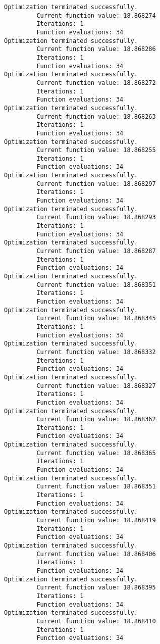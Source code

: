 \documentclass[11pt]{article}
\begin{document}
\begin{Verbatim}[commandchars=\\\{\}]
Optimization terminated successfully.
         Current function value: 18.868274
         Iterations: 1
         Function evaluations: 34
Optimization terminated successfully.
         Current function value: 18.868286
         Iterations: 1
         Function evaluations: 34
Optimization terminated successfully.
         Current function value: 18.868272
         Iterations: 1
         Function evaluations: 34
Optimization terminated successfully.
         Current function value: 18.868263
         Iterations: 1
         Function evaluations: 34
Optimization terminated successfully.
         Current function value: 18.868255
         Iterations: 1
         Function evaluations: 34
Optimization terminated successfully.
         Current function value: 18.868297
         Iterations: 1
         Function evaluations: 34
Optimization terminated successfully.
         Current function value: 18.868293
         Iterations: 1
         Function evaluations: 34
Optimization terminated successfully.
         Current function value: 18.868287
         Iterations: 1
         Function evaluations: 34
Optimization terminated successfully.
         Current function value: 18.868351
         Iterations: 1
         Function evaluations: 34
Optimization terminated successfully.
         Current function value: 18.868345
         Iterations: 1
         Function evaluations: 34
Optimization terminated successfully.
         Current function value: 18.868332
         Iterations: 1
         Function evaluations: 34
Optimization terminated successfully.
         Current function value: 18.868327
         Iterations: 1
         Function evaluations: 34
Optimization terminated successfully.
         Current function value: 18.868362
         Iterations: 1
         Function evaluations: 34
Optimization terminated successfully.
         Current function value: 18.868365
         Iterations: 1
         Function evaluations: 34
Optimization terminated successfully.
         Current function value: 18.868351
         Iterations: 1
         Function evaluations: 34
Optimization terminated successfully.
         Current function value: 18.868419
         Iterations: 1
         Function evaluations: 34
Optimization terminated successfully.
         Current function value: 18.868406
         Iterations: 1
         Function evaluations: 34
Optimization terminated successfully.
         Current function value: 18.868395
         Iterations: 1
         Function evaluations: 34
Optimization terminated successfully.
         Current function value: 18.868410
         Iterations: 1
         Function evaluations: 34

\end{Verbatim}
\end{document}
